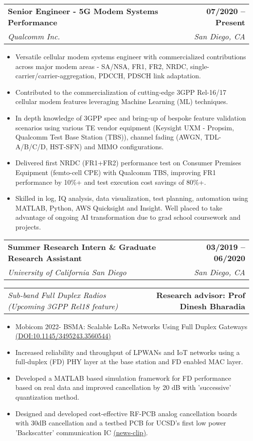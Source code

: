 \documentclass[letterpaper,11pt]{article}
\makeatletter
\newcommand{\resumeItem}[1]{
  \item\small{
    {#1 \vspace{-2pt}}
  }
}
\newcommand{\resumeSubheading}[4]{
  \vspace{-2pt}\item
    \begin{tabular*}{1.0\textwidth}[t]{l@{\extracolsep{\fill}}r}
      \textbf{#1} & \textbf{\small #2} \\
      \textit{\small#3} & \textit{\small #4} \\
    \end{tabular*}\vspace{-7pt}
}
\newcommand{\resumeProjectHeading}[2]{
    \item
    \begin{tabular*}{1.001\textwidth}{l@{\extracolsep{\fill}}r}
      \small#1 & \textbf{\small #2}\\
    \end{tabular*}\vspace{-7pt}
}
\newcommand{\resumeItemListStart}{\begin{itemize}}
\newcommand{\resumeItemListEnd}{\end{itemize}\vspace{-5pt}}
\makeatother
\begin{document}
    \resumeSubheading
      {Senior Engineer - 5G Modem Systems Performance}{07/2020 -- Present}
      {Qualcomm Inc.}{San Diego, CA}
      \resumeItemListStart
      \resumeItem{Versatile cellular modem systems engineer with commercialized contributions across major modem areas - SA/NSA, FR1, FR2, NRDC, single-carrier/carrier-aggregation, PDCCH, PDSCH link adaptation.}
        \resumeItem{Contributed to the commercialization of cutting-edge 3GPP Rel-16/17 cellular modem features leveraging Machine Learning (ML) techniques.}
        \resumeItem{In depth knowledge of 3GPP spec and bring-up of bespoke feature validation scenarios using various TE vendor equipment (Keysight UXM - Propsim, Qualcomm Test Base Station (TBS)), channel fading (AWGN, TDL-A/B/C/D, HST-SFN) and MIMO configurations.}
        \resumeItem{Delivered first NRDC (FR1+FR2) performance test on Consumer Premises Equipment (femto-cell CPE) with Qualcomm TBS, improving FR1 performance by 10\%+ and test execution cost savings of 80\%+.}
        \resumeItem{Skilled in log, IQ analysis, data visualization, test planning, automation using MATLAB, Python, AWS Quicksight and Insight. Well placed to take advantage of ongoing AI transformation due to grad school coursework and projects.}
      \resumeItemListEnd
    \resumeSubheading
      {Summer Research Intern \& Graduate Research Assistant}{03/2019 -- 06/2020}
      {University of California San Diego}{San Diego, CA}
      \vspace{-20pt}
      \resumeProjectHeading
          {\textit{\small Sub-band Full Duplex Radios (Upcoming 3GPP Rel18 feature)}}{Research advisor: Prof Dinesh Bharadia}
      \resumeItemListStart
        \resumeItem{Mobicom 2022- BSMA: Scalable LoRa Networks Using Full Duplex Gateways \href{https://rohit1347.github.io/AboutMe/mobicom22-final738.pdf}{(DOI:10.1145/3495243.3560544)}}
        \resumeItem{Increased reliability and throughput of LPWANs and IoT networks using a full-duplex (FD) PHY layer at the base station and FD enabled MAC layer.}
        \resumeItem{Developed a MATLAB based simulation framework for FD performance based on real data and improved cancellation by 20 dB with 'successive' quantization method.}
        \resumeItem{Designed and developed cost-effective RF-PCB analog cancellation boards with 30dB cancellation and a testbed PCB for UCSD’s first low power 'Backscatter' communication IC \href{https://rohit1347.github.io/AboutMe/NewChipBringsUltra-LowPowerWiFiConnectivitytoIoTDevices.pdf}{(news-clip)}.}
    \resumeItemListEnd
    
\end{document}

